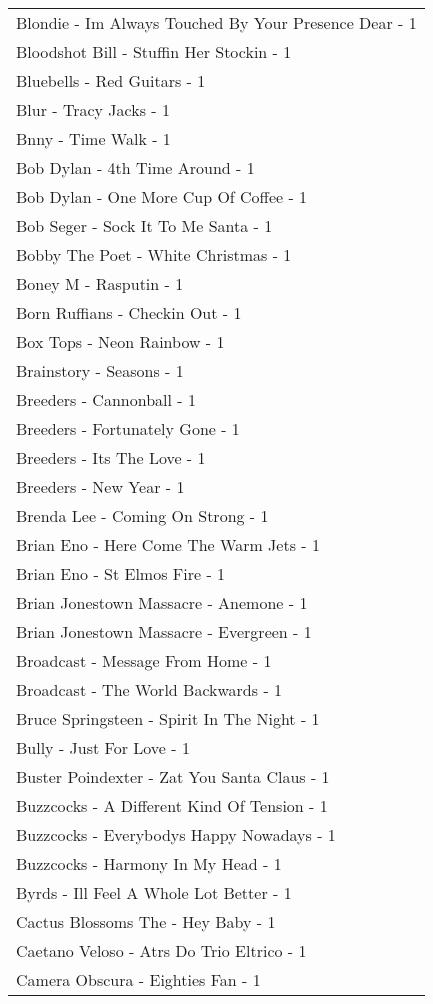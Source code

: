 \documentclass[
]{article}
\begin{document}
\begin{longtable}{l}
Blondie - Im Always Touched By Your Presence Dear - 1 \\ 
Bloodshot Bill - Stuffin Her Stockin - 1 \\ 
Bluebells - Red Guitars - 1 \\ 
Blur - Tracy Jacks - 1 \\ 
Bnny - Time Walk - 1 \\ 
Bob Dylan - 4th Time Around - 1 \\ 
Bob Dylan - One More Cup Of Coffee - 1 \\ 
Bob Seger - Sock It To Me Santa - 1 \\ 
Bobby The Poet - White Christmas - 1 \\ 
Boney M - Rasputin - 1 \\ 
Born Ruffians - Checkin Out - 1 \\ 
Box Tops - Neon Rainbow - 1 \\ 
Brainstory - Seasons - 1 \\ 
Breeders - Cannonball - 1 \\ 
Breeders - Fortunately Gone - 1 \\ 
Breeders - Its The Love - 1 \\ 
Breeders - New Year - 1 \\ 
Brenda Lee - Coming On Strong - 1 \\ 
Brian Eno - Here Come The Warm Jets - 1 \\ 
Brian Eno - St Elmos Fire - 1 \\ 
Brian Jonestown Massacre - Anemone - 1 \\ 
Brian Jonestown Massacre - Evergreen - 1 \\ 
Broadcast - Message From Home - 1 \\ 
Broadcast - The World Backwards - 1 \\ 
Bruce Springsteen - Spirit In The Night - 1 \\ 
Bully - Just For Love - 1 \\ 
Buster Poindexter - Zat You Santa Claus - 1 \\ 
Buzzcocks - A Different Kind Of Tension - 1 \\ 
Buzzcocks - Everybodys Happy Nowadays - 1 \\ 
Buzzcocks - Harmony In My Head - 1 \\ 
Byrds - Ill Feel A Whole Lot Better - 1 \\ 
Cactus Blossoms The - Hey Baby - 1 \\ 
Caetano Veloso - Atrs Do Trio Eltrico - 1 \\ 
Camera Obscura - Eighties Fan - 1 \\ 

\end{longtable}
\end{document}

